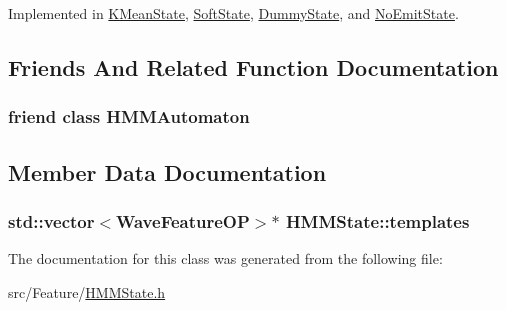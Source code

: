 Implemented in \hyperlink{class_k_mean_state_afaa85c369000eca4930c478809bbc54b}{K\+Mean\+State}, \hyperlink{class_soft_state_a0d8a511a0ba9a18b797ecb07f96f944f}{Soft\+State}, \hyperlink{class_dummy_state_a3759cade768196f1f920aa683336ed55}{Dummy\+State}, and \hyperlink{class_no_emit_state_afbe040ba5781ef6cf4f2544cb3756962}{No\+Emit\+State}.



\subsection{Friends And Related Function Documentation}
\hypertarget{class_h_m_m_state_a3f73063e67c75773ba856636249277b6}{
\subsubsection[{H\+M\+M\+Automaton}]{\setlength{\rightskip}{0pt plus 5cm}friend class {\bf H\+M\+M\+Automaton}\hspace{0.3cm}{\ttfamily [friend]}}}\label{class_h_m_m_state_a3f73063e67c75773ba856636249277b6}


\subsection{Member Data Documentation}
\hypertarget{class_h_m_m_state_a04d0b1a1570a339e5cd0db13aeb0d2ae}{
\subsubsection[{templates}]{\setlength{\rightskip}{0pt plus 5cm}std\+::vector$<${\bf Wave\+Feature\+O\+P}$>$$\ast$ H\+M\+M\+State\+::templates\hspace{0.3cm}{\ttfamily [protected]}}}\label{class_h_m_m_state_a04d0b1a1570a339e5cd0db13aeb0d2ae}


The documentation for this class was generated from the following file\+:\begin{DoxyCompactItemize}
\item 
src/\+Feature/\hyperlink{_h_m_m_state_8h}{H\+M\+M\+State.\+h}\end{DoxyCompactItemize}
